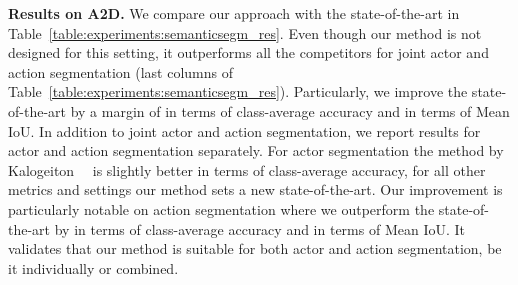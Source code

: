 \textbf{Results on A2D.} We compare our approach with the state-of-the-art in Table~\ref{table:experiments:semanticsegm_res}. Even though our method is not designed for this setting, it outperforms all the competitors for joint actor and action segmentation (last  columns of Table~\ref{table:experiments:semanticsegm_res}). Particularly, we improve the state-of-the-art by a margin of  in terms of class-average accuracy and  in terms of Mean IoU.
In addition to joint actor and action segmentation, we report results for actor and action segmentation separately. For actor segmentation the method by Kalogeiton~\etal~\cite{kalogeiton2017joint} is slightly better in terms of class-average accuracy, for all other metrics and settings our method sets a new state-of-the-art. Our improvement is particularly notable on action segmentation where we outperform the state-of-the-art by  in terms of class-average accuracy and  in terms of Mean IoU. It validates that our method is suitable for both actor and action segmentation, be it individually or combined.
